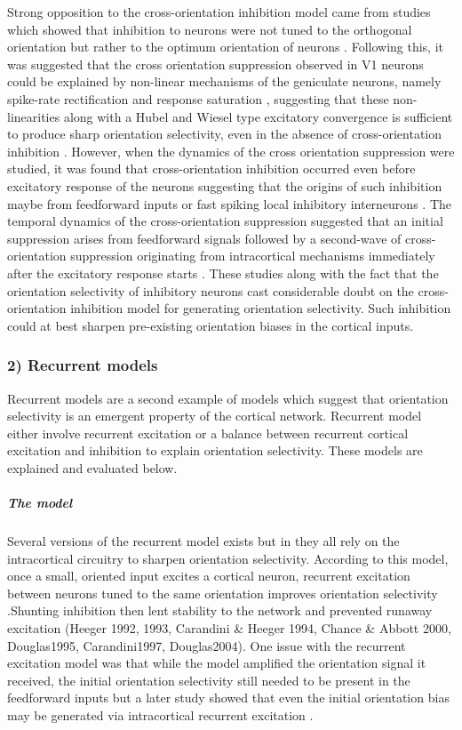 Strong opposition to the cross-orientation inhibition model came from studies which showed that inhibition to neurons were not tuned to the orthogonal orientation but rather to the optimum orientation of neurons \cite{Anderson2000, Roerig2002, Tan2011a}. Following this, it was suggested that the cross orientation suppression observed in V1 neurons could be explained by non-linear mechanisms of the geniculate neurons, namely spike-rate rectification and response saturation \cite{Priebe2006}, suggesting that these non-linearities along with a Hubel and Wiesel type excitatory convergence is sufficient to produce sharp orientation selectivity, even in the absence of cross-orientation inhibition  \cite{Priebe2006, Priebe2012, Priebe2016}. However, when the dynamics of the cross orientation suppression were studied, it was found that cross-orientation inhibition occurred even before excitatory response of the neurons suggesting that the origins of such inhibition maybe from feedforward inputs or fast spiking local inhibitory interneurons \cite{Smith2006}. The temporal dynamics of the cross-orientation suppression suggested that an initial suppression arises from feedforward signals \cite{Freeman2002, Li2006} followed by a second-wave of cross-orientation suppression originating from intracortical mechanisms immediately after the excitatory response starts \cite{Kimura2009}. These studies along with the fact that the orientation selectivity of inhibitory neurons cast considerable doubt on the cross- orientation inhibition model for generating orientation selectivity. Such inhibition could at best sharpen pre-existing orientation biases in the cortical inputs.

\subsubsection{2) Recurrent models}

Recurrent models are a second example of models which suggest that orientation selectivity is an emergent property of the cortical network. Recurrent model either involve recurrent excitation or a balance between recurrent cortical excitation and inhibition to explain orientation selectivity. These models are explained and evaluated below.

\subparagraph{The model}

Several versions of the recurrent model exists but in they all rely on the intracortical circuitry to sharpen orientation selectivity. According to this model, once a small, oriented input excites a cortical neuron, recurrent excitation between neurons tuned to the same orientation improves orientation selectivity \cite{Somers1995, Douglas1991a, Douglas1995}.Shunting inhibition then lent stability to the network and prevented runaway excitation (Heeger 1992, 1993, Carandini \& Heeger 1994, Chance \& Abbott 2000, Douglas1995, Carandini1997, Douglas2004). One issue with the recurrent excitation model was that while the model amplified the orientation signal it received, the initial orientation selectivity still needed to  be present in the feedforward inputs \cite{Douglas1995, Vidyasagar1996b} but a later study showed that even the initial orientation bias may be generated via intracortical recurrent excitation \cite{Adorjan1999}.

